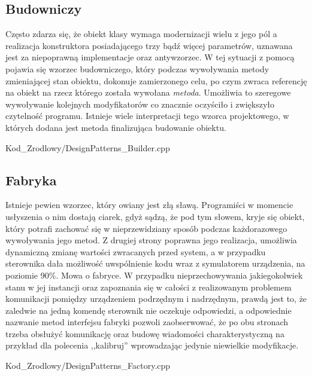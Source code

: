     \subsection{Budowniczy}
        Często zdarza się, że obiekt klasy wymaga modernizacji wielu z jego pól a realizacja konstruktora posiadającego trzy bądź więcej parametrów,
        uznawana jest za niepoprawną implementacje oraz antywzorzec. W tej sytuacji z pomocą pojawia się wzorzec budowniczego, który podczas wywoływania metody 
        zmieniającej stan obiektu, dokonuje zamierzonego celu, po czym zwraca referencję na obiekt na rzecz którego została wywołana \textit{metoda}. 
        Umożliwia to szeregowe wywoływanie kolejnych modyfikatorów co znacznie oczyściło i zwiększyło czytelność programu. Istnieje wiele interpretacji tego wzorca projektowego,
        w których dodana jest metoda finalizująca budowanie obiektu.
        
            {Kod_Zrodlowy/DesignPatterns_Builder.cpp}
    \subsection{Fabryka}
        Istnieje pewien wzorzec, który owiany jest złą sławą. Programiści w momencie usłyszenia o nim dostają ciarek, gdyż sądzą, że pod tym słowem,
        kryje się obiekt, który potrafi zachować się w nieprzewidziany sposób podczas każdorazowego wywoływania jego metod. Z drugiej strony poprawna jego realizacja, 
        umożliwia dynamiczną zmianę wartości zwracanych przed system, a w przypadku sterownika dała możliwość uwspólnienie kodu wraz z symulatorem urządzenia,
        na poziomie 90\%. Mowa o fabryce. W przypadku nieprzechowywania jakiegokolwiek stanu w jej instancji oraz zapoznania się w całości z realizowanym problemem
        komunikacji pomiędzy urządzeniem podrzędnym i nadrzędnym, prawdą jest to, że zaledwie na jedną komendę sterownik nie oczekuje odpowiedzi, a odpowiednie
        nazwanie metod interfejsu fabryki pozwoli zaobserwować, że po obu stronach trzeba obsłużyć komunikację oraz budowę wiadomości charakterystyczną na przykład
        dla polecenia ,,kalibruj'' wprowadzając jedynie niewielkie modyfikacje. 
        
        {Kod_Zrodlowy/DesignPatterns_Factory.cpp}
